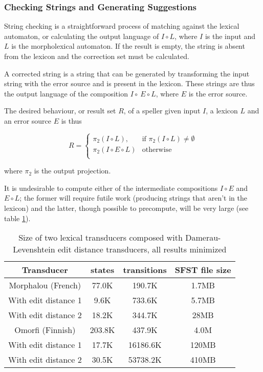 \documentclass{llncs}
\begin{document}
\subsubsection{Checking Strings and Generating Suggestions}
String checking is a straightforward process of matching against the lexical
automaton, or calculating the output language of $I \circ L$, where $I$ is the
input and $L$ is the morpholexical automaton. If the result is empty, the
string is absent from the lexicon and the correction set must be calculated.

A corrected string is a string that can be generated by transforming the
input string with the error source and is present in the lexicon.
These strings are thus the output language of the composition
$I \circ \ E \circ L$, where $E$ is the error source.

The desired behaviour, or result set $R$, of a speller given input $I$, a
lexicon $L$ and an error source $E$ is thus

\begin{equation*}R = \begin{cases}
\pi_2(I \circ L), & \mbox{if } \pi_2(I \circ L) \neq \emptyset \\
\pi_2(I \circ E \circ L) & \mbox{otherwise}\\
\end{cases}
\end{equation*}

where $\pi_2$ is the output projection.

It is undesirable to compute either of the intermediate compositions
$I \circ E$ and $E \circ L$; the former will require futile work (producing
strings that aren't in the lexicon) and the latter, though possible to
precompute, will be very large (see table \ref{composed_error_table}).

\begin{table}
  \centering
  \caption{Size of two lexical transducers composed with
    Damerau-Levenshtein edit distance transducers, all results minimized}
  \label{composed_error_table}
  \begin{tabular}{ |c| c c c| }
\hline
  Transducer               & states   & transitions & SFST file size \\ \hline
  Morphalou (French)       & 77.0K    & 190.7K   & 1.7MB \\
  With edit distance 1     & 9.6K     & 733.6K   & 5.7MB \\
  With edit distance 2     & 18.2K    & 344.7K  & 28MB \\ \hline
  Omorfi (Finnish)         & 203.8K   & 437.9K   & 4.0M \\
  With edit distance 1     & 17.7K    & 16186.6K & 120MB \\
  With edit distance 2     & 30.5K    & 53738.2K & 410MB \\ \hline
  \end{tabular}

\end{table}
\end{document}
